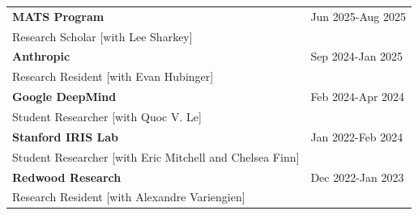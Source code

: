 \begin{longtable}[l]{@{}p{} >{\raggedleft\arraybackslash}p{}@{}}
    \textbf{MATS Program} & Jun 2025-Aug 2025 \\
    Research Scholar [with Lee Sharkey] & \\[0.5em]
    \textbf{Anthropic} & Sep 2024-Jan 2025 \\
    Research Resident [with Evan Hubinger] & \\[0.5em]
    \textbf{Google DeepMind} & Feb 2024-Apr 2024 \\
    Student Researcher [with Quoc V. Le] & \\[0.5em]
    \textbf{Stanford IRIS Lab} & Jan 2022-Feb 2024 \\
    Student Researcher [with Eric Mitchell and Chelsea Finn] & \\[0.5em]
    \textbf{Redwood Research} & Dec 2022-Jan 2023 \\
    Research Resident [with Alexandre Variengien] &
\end{longtable}